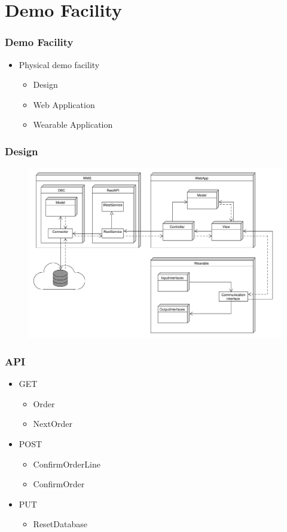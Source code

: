 \section{Demo Facility}
\begin{frame}\frametitle{Demo Facility}
	\begin{itemize}
		\item Physical demo facility
		\begin{itemize}
			\item Design
			\item Web Application
			\item Wearable Application
		\end{itemize}
	\end{itemize}
\end{frame}
\begin{frame}\frametitle{Design}
\begin{figure}
	\includegraphics[height=.8\textheight]{images/ClassDiagram_Level1}
\end{figure}
\end{frame}
\begin{frame}\frametitle{API}
	\begin{itemize}
		\item GET
		\begin{itemize}
			\item Order
			\item NextOrder
		\end{itemize}
		\item POST
		\begin{itemize}
			\item ConfirmOrderLine
			\item ConfirmOrder
		\end{itemize}
		\item PUT
		\begin{itemize}
			\item ResetDatabase
		\end{itemize}
	\end{itemize}
\end{frame}
